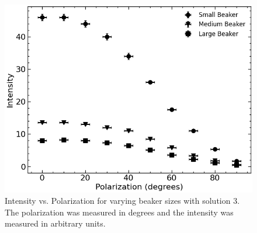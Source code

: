 \begin{figure}[H]
    \begin{center}
        \includegraphics[width=\columnwidth]{../figures/solution3.png}
    \end{center}
    \caption{Intensity vs. Polarization for varying beaker sizes with solution 3. The polarization was measured in degrees and the intensity was measured in arbitrary units.}
    \label{solution3_figure}
\end{figure}

